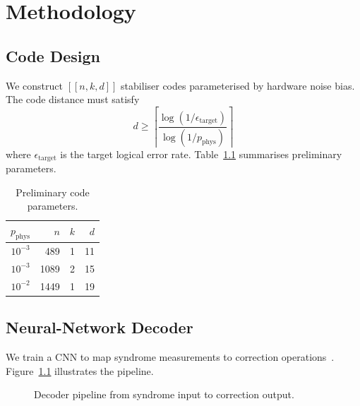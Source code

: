 \documentclass[
    language=english,
    doctype=research-proposal,
    institution=none,
    titlestyle=book,
]{../../omnilatex}
\begin{document}
\chapter{Methodology}

\section{Code Design}
We construct $[[n,k,d]]$ stabiliser codes parameterised by hardware noise bias.
The code distance must satisfy
\begin{equation}
    d \geq \left\lceil \frac{\log(1/\epsilon_{\mathrm{target}})}
    {\log(1/p_{\mathrm{phys}})} \right\rceil
    \label{eq:distance}
\end{equation}
where $\epsilon_{\mathrm{target}}$ is the target logical error rate.
Table~\ref{tab:codes} summarises preliminary parameters.

\begin{table}[htbp]
    \centering
    \caption{Preliminary code parameters.}
    \label{tab:codes}
    \begin{tabular}{@{}rrrr@{}}
        \toprule
        $p_{\mathrm{phys}}$ & $n$ & $k$ & $d$ \\
        \midrule
        $10^{-3}$ & 489  & 1 & 11 \\
        $10^{-3}$ & 1089 & 2 & 15 \\
        $10^{-2}$ & 1449 & 1 & 19 \\
        \bottomrule
    \end{tabular}
\end{table}

\section{Neural-Network Decoder}
We train a CNN to map syndrome measurements to correction
operations~\cite{birdNaturalLanguageProcessing2009}.  Figure~\ref{fig:decoder}
illustrates the pipeline.

\begin{figure}[htbp]
    \centering
    \caption{Decoder pipeline from syndrome input to correction output.}
    \label{fig:decoder}
\end{figure}
\end{document}
